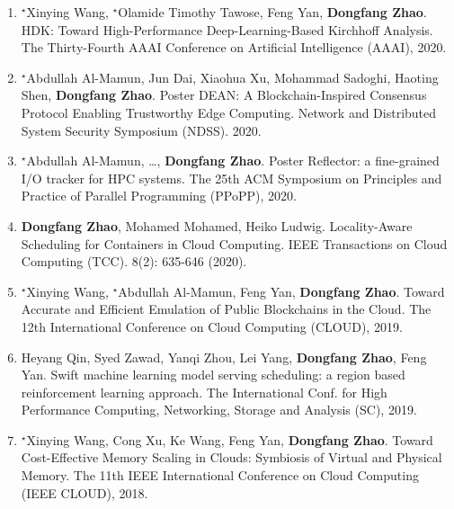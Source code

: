 \documentclass[11pt,]{scrartcl}
\begin{document}
\begin{enumerate}
\item $^\star$Xinying Wang, $^\star$Olamide Timothy Tawose, Feng Yan, \textbf{Dongfang Zhao}.
HDK: Toward High-Performance Deep-Learning-Based Kirchhoff Analysis. The Thirty-Fourth AAAI Conference on Artificial Intelligence (AAAI), 2020. 


\item $^\star$Abdullah Al-Mamun, Jun Dai, Xiaohua Xu, Mohammad Sadoghi, Haoting Shen, \textbf{Dongfang Zhao}.
Poster DEAN: A Blockchain-Inspired Consensus Protocol Enabling Trustworthy Edge Computing.
Network and Distributed System Security Symposium (NDSS).
2020.

\item $^\star$Abdullah Al-Mamun, \dots, \textbf{Dongfang Zhao}.
Poster Reflector: a fine-grained I/O tracker for HPC systems. 
The 25th ACM Symposium on Principles and Practice of Parallel Programming (PPoPP), 2020.

\item \textbf{Dongfang Zhao}, Mohamed Mohamed, Heiko Ludwig.
Locality-Aware Scheduling for Containers in Cloud Computing. IEEE Transactions on Cloud Computing (TCC). 8(2): 635-646 (2020).


\item 	$^\star$Xinying Wang, $^\star$Abdullah Al-Mamun, Feng Yan, \textbf{Dongfang Zhao}.
Toward Accurate and Efficient Emulation of Public Blockchains in the Cloud. The 12th International Conference on Cloud Computing (CLOUD), 2019. 

\item Heyang Qin, Syed Zawad, Yanqi Zhou, Lei Yang, \textbf{Dongfang Zhao}, Feng Yan.
Swift machine learning model serving scheduling: a region based reinforcement learning approach.
The International Conf. for High Performance Computing, Networking, Storage and Analysis (SC), 2019.

\item 	$^\star$Xinying Wang, Cong Xu, Ke Wang, Feng Yan, \textbf{Dongfang Zhao}.
Toward Cost-Effective Memory Scaling in Clouds: Symbiosis of Virtual and Physical Memory. The 11th IEEE International Conference on Cloud Computing (IEEE CLOUD), 2018.


\end{enumerate}
\end{document}

